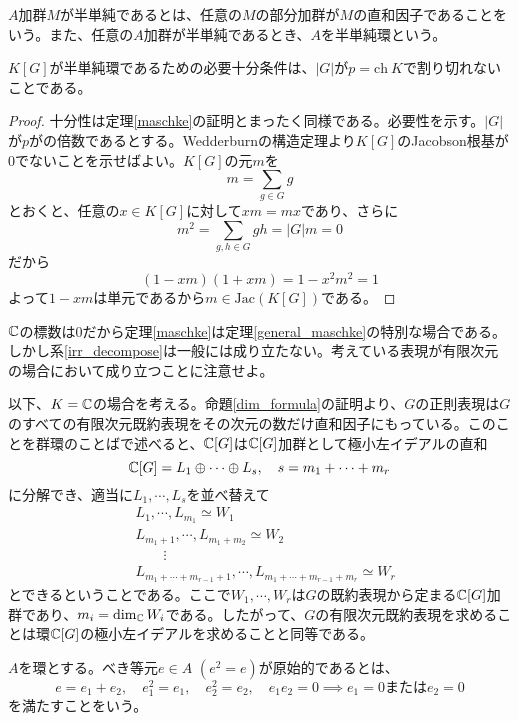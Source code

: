 \documentclass{ltjsarticle}
\begin{document}
\begin{defin}
  $A$加群$M$が半単純であるとは、任意の$M$の部分加群が$M$の直和因子であることをいう。また、任意の$A$加群が半単純であるとき、$A$を半単純環という。
\end{defin}

\begin{theo}[Maschkeの定理]\label{general_maschke}
  $K[G]$が半単純環であるための必要十分条件は、$|G|$が$p=\text{ch}\:K$で割り切れないことである。
\end{theo}

\begin{proof}
  十分性は定理\ref{maschke}の証明とまったく同様である。必要性を示す。$|G|$が$p$がの倍数であるとする。Wedderburnの構造定理より$K[G]$のJacobson根基が0でないことを示せばよい。$K[G]$の元$m$を
  \[
  m=\sum_{g\in G}g  
  \]
  とおくと、任意の$x\in K[G]$に対して$xm=mx$であり、さらに
  \[
  m^2=\sum_{g,h\in G}gh=|G|m=0  
  \]
  だから
  \[
  (1-xm)(1+xm)=1-x^2m^2=1  
  \]
  よって$1-xm$は単元であるから$m\in\text{Jac}(K[G])$である。
\end{proof}


$\mathbb{C}$の標数は0だから定理\ref{maschke}は定理\ref{general_maschke}の特別な場合である。しかし系\ref{irr_decompose}は一般には成り立たない。考えている表現が有限次元の場合において成り立つことに注意せよ。

以下、$K=\mathbb{C}$の場合を考える。命題\ref{dim_formula}の証明より、$G$の正則表現は$G$のすべての有限次元既約表現をその次元の数だけ直和因子にもっている。このことを群環のことばで述べると、$\mathbb{C}[G]$は$\mathbb{C}[G]$加群として極小左イデアルの直和
\[
\mathbb{C}[G]=L_1\oplus\cdots\oplus L_s,\quad s=m_1+\cdots+m_r
\]
に分解でき、適当に$L_1,\cdots,L_s$を並べ替えて
\begin{align*}
&L_1,\cdots,L_{m_1}\simeq W_1\\
&L_{m_1+1},\cdots,L_{m_1+m_2}\simeq W_2\\
&\qquad \vdots\\
&L_{m_1+\cdots+m_{r-1}+1},\cdots,L_{m_1+\cdots+m_{r-1}+m_r}\simeq W_r
\end{align*}
とできるということである。ここで$W_1,\cdots,W_r$は$G$の既約表現から定まる$\mathbb{C}[G]$加群であり、$m_i=\dim_{\mathbb{C}}W_i$である。したがって、$G$の有限次元既約表現を求めることは環$\mathbb{C}[G]$の極小左イデアルを求めることと同等である。

\begin{defin}
  $A$を環とする。べき等元$e\in A$ $(e^2=e)$が原始的であるとは、
  \[
  e=e_1+e_2,\quad e_1^2=e_1,\quad e_2^2=e_2,\quad e_1e_2=0\implies e_1=0\text{または}e_2=0 
  \]
  を満たすことをいう。
\end{defin}
\end{document}
